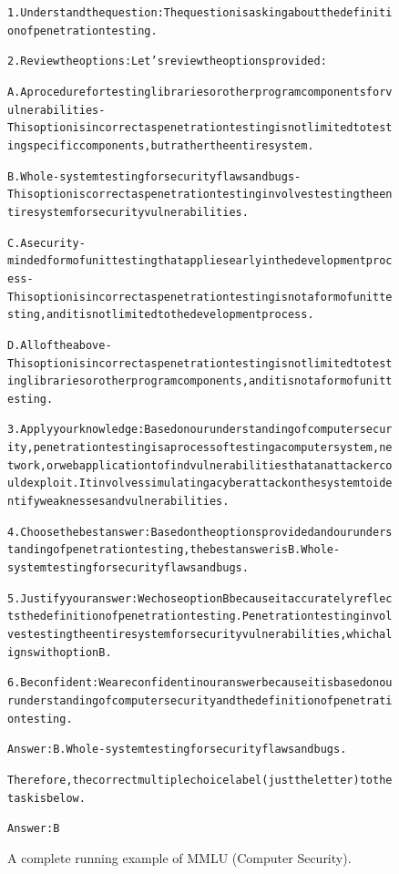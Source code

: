 \begin{figure}[t]
{{\begin{alltt}
1. Understand the question: The question is asking about the definition of penetration testing.

2. Review the options: Let's review the options provided:

A. A procedure for testing libraries or other program components for vulnerabilities - This option is incorrect as penetration testing is not limited to testing specific components, but rather the entire system.

B. Whole-system testing for security flaws and bugs - This option is correct as penetration testing involves testing the entire system for security vulnerabilities.

C. A security-minded form of unit testing that applies early in the development process - This option is incorrect as penetration testing is not a form of unit testing, and it is not limited to the development process.

D. All of the above - This option is incorrect as penetration testing is not limited to testing libraries or other program components, and it is not a form of unit testing.

3. Apply your knowledge: Based on our understanding of computer security, penetration testing is a process of testing a computer system, network, or web application to find vulnerabilities that an attacker could exploit. It involves simulating a cyber attack on the system to identify weaknesses and vulnerabilities.

4. Choose the best answer: Based on the options provided and our understanding of penetration testing, the best answer is B. Whole-system testing for security flaws and bugs.

5. Justify your answer: We chose option B because it accurately reflects the definition of penetration testing. Penetration testing involves testing the entire system for security vulnerabilities, which aligns with option B.

6. Be confident: We are confident in our answer because it is based on our understanding of computer security and the definition of penetration testing.

Answer: B. Whole-system testing for security flaws and bugs.

Therefore, the correct multiple choice label (just the letter) to the task is below.

Answer: B
\end{alltt}
}}
\caption{A complete running example of MMLU (Computer Security).}
\label{fig:mmlu_subject=computer_security_example}
\end{figure}
